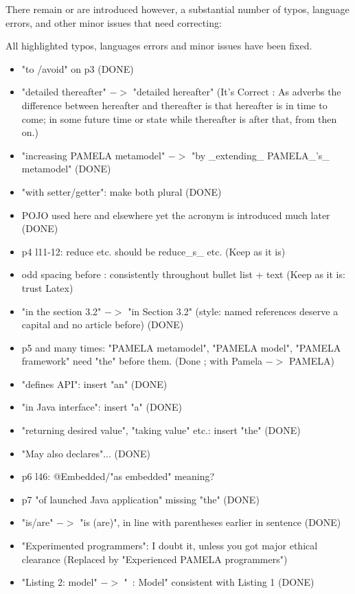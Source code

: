 \documentclass[10pt]{article}
\begin{document}
\begin{response}{There remain or are introduced however, a substantial number of typos, language errors, and other minor issues that need correcting:} 

All highlighted typos, languages errors and minor issues have been fixed.

\begin{itemize}

\item "to /avoid" on p3 (DONE)
\item "detailed thereafter" $->$ "detailed hereafter" (It's Correct : As adverbs the difference between hereafter and thereafter is that hereafter is in time to come; in some future time or state while thereafter is after that, from then on.)
\item "increasing PAMELA metamodel" $->$ "by \_extending\_ PAMELA\_'s\_ metamodel" (DONE)
\item "with setter/getter": make both plural (DONE)
\item POJO used here and elsewhere yet the acronym is introduced much later (DONE)
\item p4 l11-12: reduce etc. should be reduce\_s\_ etc. (Keep as it is)
\item odd spacing before : consistently throughout bullet list + text  (Keep as it is: trust Latex)
\item "in the section 3.2" $->$ "in Section 3.2" (style: named references deserve a capital and no article before) (DONE)
\item p5 and many times: "PAMELA metamodel", "PAMELA model", "PAMELA framework" need "the" before them. (Done ; with Pamela $->$ PAMELA)
\item "defines API": insert "an" (DONE)
\item "in Java interface": insert "a" (DONE)
\item "returning desired value", "taking value" etc.: insert "the" (DONE)
\item "May also declares"... (DONE)
\item p6 l46: @Embedded/"as embedded" meaning?
\item p7 "of launched Java application" missing "the" (DONE)
\item "is/are" $->$ "is (are)", in line with parentheses earlier in sentence (DONE)
\item "Experimented programmers": I doubt it, unless you got major ethical clearance (Replaced by "Experienced PAMELA programmers")
\item "Listing 2: model" $->$ "~: Model" consistent with Listing 1 (DONE)

\end{itemize}
\end{response}
\end{document}
